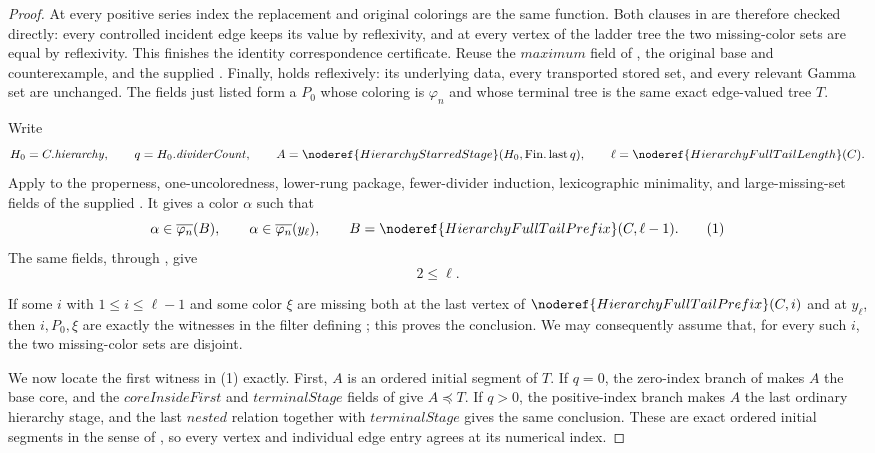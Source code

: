 \begin{proof}
At every positive series index the replacement and original colorings are
the same function.  Both clauses in  are therefore
checked directly: every controlled incident edge keeps its value by
reflexivity, and at every vertex of the ladder tree the two missing-color
sets are equal by reflexivity.  This finishes the identity
correspondence certificate.  Reuse the \(\mathit{maximum}\) field of
, the original base and counterexample,
and the supplied .
Finally,
 holds reflexively: its underlying
 data, every transported stored set, and
every relevant Gamma set are unchanged.  The fields just listed form a
 \(P_0\) whose coloring is
\(\varphi_n\) and whose terminal tree is the same exact edge-valued
tree \(T\).

Write
\[
 H_0=C.\mathit{hierarchy},\qquad
 q=H_0.\mathit{dividerCount},\qquad
 A=\noderef{HierarchyStarredStage}(H_0,\operatorname{Fin.last}q),
 \qquad
 \ell=\noderef{HierarchyFullTailLength}(C).
\]
Apply  to the
properness, one-uncoloredness, lower-rung package, fewer-divider
induction, lexicographic minimality, and large-missing-set fields of the
supplied .  It gives a
color \(\alpha\) such that
\[
 \alpha\in\overline{\varphi_n}(B),\qquad
 \alpha\in\overline{\varphi_n}(y_\ell),\qquad
 B=\noderef{HierarchyFullTailPrefix}(C,\ell-1).               \tag{1}
\]
The same fields, through
, give
\[
                              2\leq\ell.                      \tag{2}
\]

If some \(i\) with \(1\leq i\leq\ell-1\) and some color \(\xi\)
are missing both at the last vertex of
\(\noderef{HierarchyFullTailPrefix}(C,i)\) and at \(y_\ell\),
then \(i,P_0,\xi\) are exactly the witnesses in the filter defining
; this proves the
conclusion.  We may consequently assume that, for every such \(i\), the
two missing-color sets are disjoint.                              \(\tag{3}\)

We now locate the first witness in (1) exactly.  First,
\(A\) is an ordered initial segment of \(T\).  If \(q=0\), the
zero-index branch of  makes \(A\) the
base core, and the \(\mathit{coreInsideFirst}\) and
\(\mathit{terminalStage}\) fields of
 give \(A\preccurlyeq T\).  If \(q>0\), the
positive-index branch makes \(A\) the last ordinary hierarchy stage, and
the last \(\mathit{nested}\) relation together with
\(\mathit{terminalStage}\) gives the same conclusion.  These are exact
ordered initial segments in the sense of
, so every vertex and individual edge
entry agrees at its numerical index.


\end{proof}
